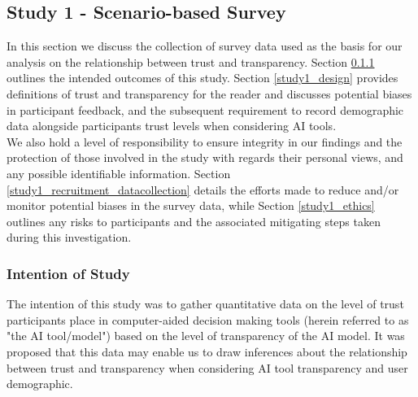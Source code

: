 \documentclass[manuscript,screen,review]{acmart}
\begin{document}




\subsection{Study 1 - Scenario-based Survey }
In this section we discuss the collection of survey data used as the basis for our analysis on the relationship between trust and transparency. Section \ref{study1_intentions} outlines the intended outcomes of this study. Section \ref{study1_design} provides definitions of trust and transparency for the reader and discusses potential biases in participant feedback, and the subsequent requirement to record demographic data alongside participants trust levels when considering AI tools.\\

We also hold a level of responsibility to ensure integrity in our findings and the protection of those involved in the study with regards their personal views, and any possible identifiable information. Section \ref{study1_recruitment_datacollection} details the efforts made to reduce and/or monitor potential biases in the survey data, while Section \ref{study1_ethics} outlines any risks to participants and the associated mitigating steps taken during this investigation.
\subsubsection{Intention of Study} 
\label{study1_intentions}
The intention of this study was to gather quantitative data on the level of trust participants place in computer-aided decision making tools (herein referred to as "the AI tool/model") based on the level of transparency of the AI model. It was proposed that this data may enable us to draw inferences about the relationship between trust and transparency when considering AI tool transparency and user demographic. 
\end{document}
